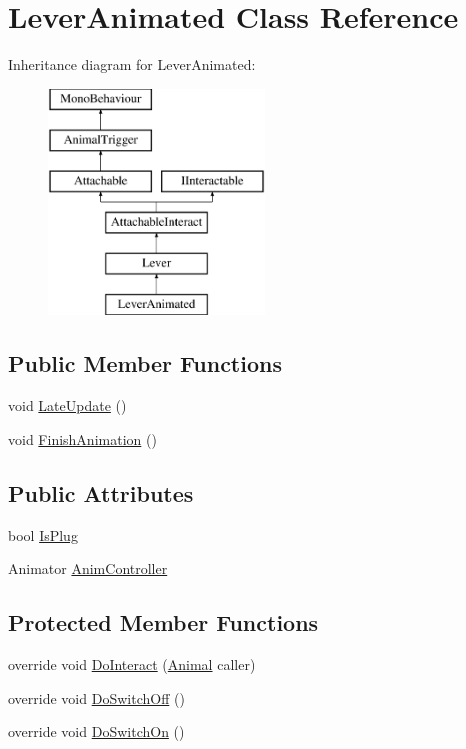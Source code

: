 \hypertarget{class_lever_animated}{}\section{Lever\+Animated Class Reference}
\label{class_lever_animated}
Inheritance diagram for Lever\+Animated\+:\begin{figure}[H]
\begin{center}
\leavevmode
\includegraphics[height=6.000000cm]{class_lever_animated}
\end{center}
\end{figure}
\subsection*{Public Member Functions}
\begin{DoxyCompactItemize}
\item 
void \mbox{\hyperlink{class_lever_animated_afbb34fdee619015300e91e7617ab79e5}{Late\+Update}} ()
\item 
void \mbox{\hyperlink{class_lever_animated_a0b36ecd4e414019787a0554171ee5a7a}{Finish\+Animation}} ()
\end{DoxyCompactItemize}
\subsection*{Public Attributes}
\begin{DoxyCompactItemize}
\item 
bool \mbox{\hyperlink{class_lever_animated_acef00a2288f01bca348805839a58fe0f}{Is\+Plug}}
\item 
Animator \mbox{\hyperlink{class_lever_animated_abbc4dcc302c3fe4eebd533d07d62cd60}{Anim\+Controller}}
\end{DoxyCompactItemize}
\subsection*{Protected Member Functions}
\begin{DoxyCompactItemize}
\item 
override void \mbox{\hyperlink{class_lever_animated_a63d3742fe2e3b7597c7eecbc57ae7a0e}{Do\+Interact}} (\mbox{\hyperlink{class_animal}{Animal}} caller)
\item 
override void \mbox{\hyperlink{class_lever_animated_a2b56274f9c38469d1bb76321b87dc397}{Do\+Switch\+Off}} ()
\item 
override void \mbox{\hyperlink{class_lever_animated_a2b655bf2b974e395ab4ffb343056c63d}{Do\+Switch\+On}} ()
\end{DoxyCompactItemize}
